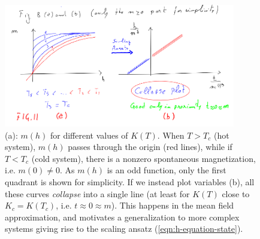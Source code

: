 \documentclass[../../main.tex]{subfiles}
\begin{document}
\begin{figure}[H]
    \centering
    \includegraphics[width=0.9\textwidth]{collapse_plot.png}
    \caption{(a): $m(h)$ for different values of $K(T)$. When $T > T_c$ (hot system), $m(h)$ passes through the origin (red lines), while if $T < T_c$ (cold system), there is a nonzero spontaneous magnetization, i.e. $m(0) \neq 0$. As $m(h)$ is an odd function, only the first quadrant is shown for simplicity. If we instead plot  variables (b), all these curves \textit{collapse} into a single line (at least for $K(T)$ close to $K_c = K(T_c)$, i.e. $t \approx 0 \approx m$). This happens in the mean field approximation, and motivates a generalization to more complex systems giving rise to the scaling ansatz (\ref{eqn:h-equation-state}).}
    \label{fig:collapse_plot}
\end{figure}
\end{document}
